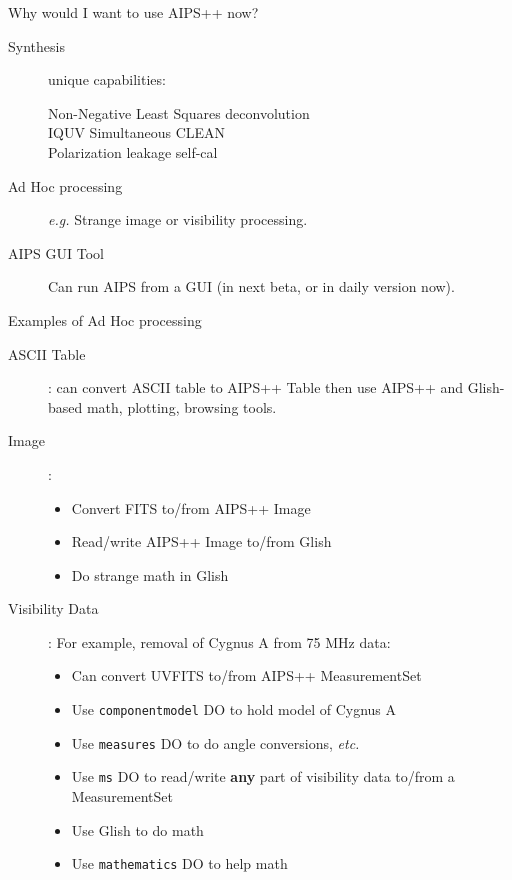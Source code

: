 \documentclass[11pt]{article}
\begin{document}
\begin{slide}{Why would I want to use AIPS++ now?}
\begin{description}
\item[Synthesis] unique capabilities:
\begin{description}
\item[Non-Negative Least Squares deconvolution]
\item[IQUV Simultaneous CLEAN]
\item[Polarization leakage self-cal]
\end{description}
\item[Ad Hoc processing] {\em e.g.} Strange image or visibility
processing.
\item[AIPS GUI Tool] Can run AIPS from a GUI (in next beta, or in daily
version now).
\end{description}
\end{slide}

\begin{slide}{Examples of Ad Hoc processing}
\begin{description}
\item[ASCII Table]: can convert ASCII table to AIPS++ Table then
use AIPS++ and Glish-based math, plotting, browsing tools.
\item[Image]:
\begin{itemize}
\item Convert FITS to/from AIPS++ Image
\item Read/write AIPS++ Image to/from Glish
\item Do strange math in Glish
\end{itemize}
\item[Visibility Data]: For example, removal of Cygnus A from
75 MHz data:
\begin{itemize}
\item Can convert UVFITS to/from AIPS++ MeasurementSet
\item Use {\tt componentmodel} DO to hold model of Cygnus A
\item Use {\tt measures} DO to do angle conversions, {\em etc.}
\item Use {\tt ms} DO to read/write {\bf any} part of visibility
data to/from a MeasurementSet
\item Use Glish to do math
\item Use {\tt mathematics} DO to help math
\end{itemize}
\end{description}
\end{slide}
\end{document}
